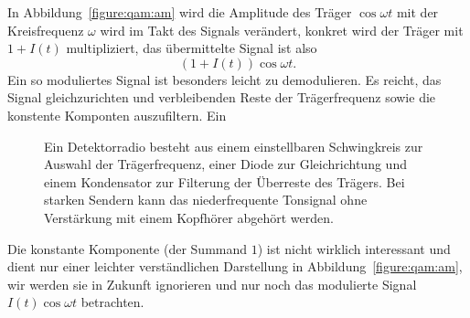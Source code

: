 In Abbildung~\ref{figure:qam:am} wird die Amplitude des Träger
$\cos\omega t$ mit der Kreisfrequenz $\omega$ wird im Takt des
Signals verändert,
konkret wird der Träger mit $1+I(t)$ multipliziert,
das übermittelte Signal ist also
\begin{equation}
(1+I(t)) \cos\omega t.
\end{equation}
Ein so moduliertes Signal ist besonders leicht zu demodulieren.
Es reicht, das Signal gleichzurichten und verbleibenden Reste
der Trägerfrequenz sowie die konstente Komponten auszufiltern.
Ein
\begin{figure}
\centering
{}
\caption{Ein Detektorradio besteht aus einem einstellbaren
Schwingkreis zur Auswahl der Trägerfrequenz, einer Diode zur
Gleichrichtung und einem Kondensator zur Filterung der Überreste
des Trägers.
Bei starken Sendern kann das niederfrequente Tonsignal ohne
Verstärkung mit einem Kopfhörer abgehört werden.
\label{figure:qam:detektor}}
\end{figure}
Die konstante Komponente (der Summand $1$) ist nicht wirklich
interessant und dient nur einer leichter verständlichen Darstellung
in Abbildung~\ref{figure:qam:am}, wir werden sie in Zukunft 
ignorieren und nur noch das modulierte Signal $I(t)\cos\omega t$
betrachten.

